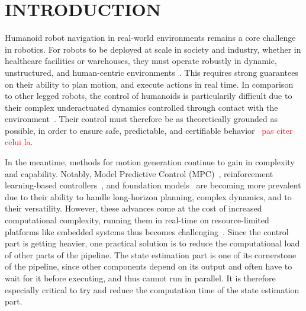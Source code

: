 \documentclass{IJCAS}
\begin{document}




\section{INTRODUCTION}


Humanoid robot navigation in real-world environments remains a core challenge in robotics. For robots to be deployed at scale in society and industry, whether in healthcare facilities or warehouses, they must operate robustly in dynamic, unstructured, and human-centric environments~\cite{Kuindersma2015OptimizationBasedLocomAtlas}. This requires strong guarantees on their ability to plan motion, and execute actions in real time. In comparison to other legged robots, the control of humanoids is particularily difficult due to their complex underactuated dynamics controlled through contact with the environment~\cite{sugihara2020surveyDynamicsHumanoids}. Their control must therefore be as theoretically grounded as possible, in order to ensure safe, predictable, and certifiable behavior~\cite{Weng2022OnSafetyTestingLeggedRobots} \textcolor{red}{pas citer celui la}.

In the meantime, methods for motion generation continue to gain in complexity and capability. Notably, Model Predictive Control (MPC)~\cite{Katayama2023MpcLeggedHumanoid, Dantec2022WholeBodyMPCTorqueControl, Dallard2024AdiosStabilizers}, reinforcement learning-based controllers~\cite{Peters2003ReinforcmentLearningForHumanoid, Li2025RLVersatileDynamicRobustBipedalLocom}, and foundation models~\cite{Bjorck2025GrootN1, kawaharazuka2024RealWorldApplicationsFoundationModels} are becoming more prevalent due to their ability to handle long-horizon planning, complex dynamics, and to their versatility. However, these advances come at the cost of increased computational complexity, running them in real-time on resource-limited platforms like embedded systems thus becomes challenging~\cite{Zeilinger2014RealTimeRobustMPC, findeisen2004computationalDelayNMPC, Thodoroff2022BenchmarkingRealTimeRL, Firoozi2025FoundationModelsInRobotics}. Since the control part is getting heavier, one practical solution is to reduce the computational load of other parts of the pipeline. The state estimation part is one of its cornerstone of the pipeline, since other components depend on its output and often have to wait for it before executing, and thus cannot run in parallel. It is therefore especially critical to try and reduce the computation time of the state estimation part.
\end{document}
